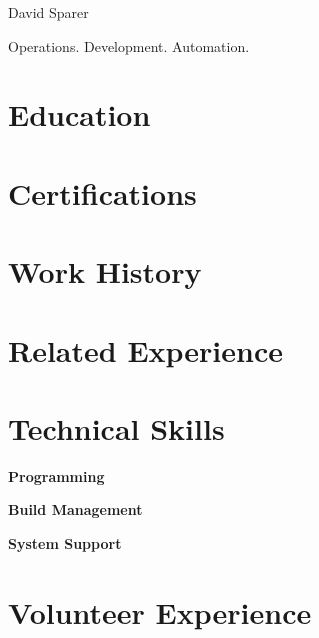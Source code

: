 \documentclass{cls/res}
\begin{document}
	\thispagestyle{empty} %

	\begin{resume}
		\vspace{-0.5in}
		\begin{minipage}[c]{0.78\textwidth}
			\centerline{{\Huge David Sparer}}
			\vspace{.2in}
			\centerline{Operations. Development. Automation.}
		\end{minipage}
		\begin{minipage}[c]{0.25\textwidth}
			
		\end{minipage}

		\section{Education}
			\vspace{0.1in}
			

		\section{Certifications}
			\vspace{0.1in}
			

		\section{Work History}
			
			
			
			
			
			

		\section{Related Experience}
			\vspace{0.1in}
			

		\section{Technical Skills}
			\vspace{0.1in}
			{\bf Programming}
				
			{\bf Build Management}
				
			{\bf System Support}
				

		\section{Volunteer Experience}
			\vspace{0.1in}
			
			
	\end{resume}
\end{document}
